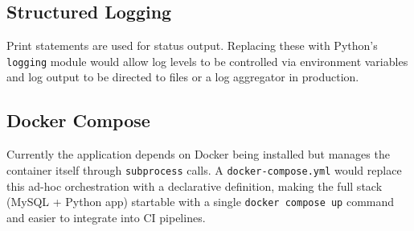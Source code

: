 \documentclass[12pt,a4paper]{article}
\begin{document}
\subsection{Structured Logging}

Print statements are used for status output. Replacing these with Python's
\texttt{logging} module would allow log levels to be controlled via environment
variables and log output to be directed to files or a log aggregator in
production.

\subsection{Docker Compose}

Currently the application depends on Docker being installed but manages the
container itself through \texttt{subprocess} calls. A
\texttt{docker-compose.yml} would replace this ad-hoc orchestration with a
declarative definition, making the full stack (MySQL + Python app) startable
with a single \texttt{docker compose up} command and easier to integrate into
CI pipelines.
\end{document}
